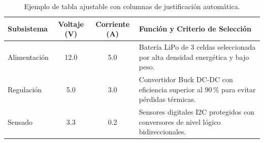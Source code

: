 \begin{table}[htbp]
    \centering
    \caption{Ejemplo de tabla ajustable con columnas de justificación automática.}
    \label{tab:ejemplo-tabularx}
    \begin{tabularx}{\textwidth}{l c c X}
        \toprule
        \textbf{Subsistema} & \textbf{Voltaje (\unit{\volt})} & \textbf{Corriente (\unit{\ampere})} & \textbf{Función y Criterio de Selección} \\
        \midrule
        Alimentación & 12.0 & 5.0 & Batería LiPo de 3 celdas seleccionada por alta densidad energética y bajo peso. \\
        Regulación & 5.0 & 3.0 & Convertidor Buck DC-DC con eficiencia superior al $90\,\%$ para evitar pérdidas térmicas. \\
        Sensado & 3.3 & 0.2 & Sensores digitales I2C protegidos con conversores de nivel lógico bidireccionales. \\
        \bottomrule
    \end{tabularx}
\end{table}
